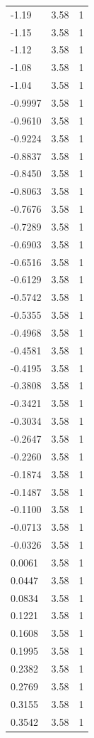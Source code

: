 \begin{longtable}{lrr}
  -1.19 & 3.58 & 1 \\
  -1.15 & 3.58 & 1 \\
  -1.12 & 3.58 & 1 \\
  -1.08 & 3.58 & 1 \\
  -1.04 & 3.58 & 1 \\
  -0.9997 & 3.58 & 1 \\
  -0.9610 & 3.58 & 1 \\
  -0.9224 & 3.58 & 1 \\
  -0.8837 & 3.58 & 1 \\
  -0.8450 & 3.58 & 1 \\
  -0.8063 & 3.58 & 1 \\
  -0.7676 & 3.58 & 1 \\
  -0.7289 & 3.58 & 1 \\
  -0.6903 & 3.58 & 1 \\
  -0.6516 & 3.58 & 1 \\
  -0.6129 & 3.58 & 1 \\
  -0.5742 & 3.58 & 1 \\
  -0.5355 & 3.58 & 1 \\
  -0.4968 & 3.58 & 1 \\
  -0.4581 & 3.58 & 1 \\
  -0.4195 & 3.58 & 1 \\
  -0.3808 & 3.58 & 1 \\
  -0.3421 & 3.58 & 1 \\
  -0.3034 & 3.58 & 1 \\
  -0.2647 & 3.58 & 1 \\
  -0.2260 & 3.58 & 1 \\
  -0.1874 & 3.58 & 1 \\
  -0.1487 & 3.58 & 1 \\
  -0.1100 & 3.58 & 1 \\
  -0.0713 & 3.58 & 1 \\
  -0.0326 & 3.58 & 1 \\
  0.0061 & 3.58 & 1 \\
  0.0447 & 3.58 & 1 \\
  0.0834 & 3.58 & 1 \\
  0.1221 & 3.58 & 1 \\
  0.1608 & 3.58 & 1 \\
  0.1995 & 3.58 & 1 \\
  0.2382 & 3.58 & 1 \\
  0.2769 & 3.58 & 1 \\
  0.3155 & 3.58 & 1 \\
  0.3542 & 3.58 & 1 \\

\end{longtable}
